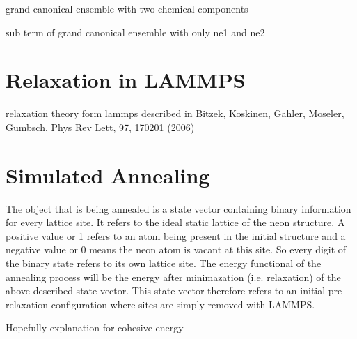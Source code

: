 grand canonical ensemble with two chemical components

sub term of grand canonical ensemble with only ne1 and ne2
\section{Relaxation in LAMMPS}
relaxation theory form lammps 
described in Bitzek, Koskinen, Gahler, Moseler, Gumbsch, Phys Rev Lett, 97, 170201 (2006)
 
\section{Simulated Annealing}
The object that is being annealed is a state vector containing binary information for every lattice site. It refers to the ideal static lattice of the neon structure. A positive value or 1 refers to an atom being present in the initial structure and a negative value or 0 means the neon atom is vacant at this site. So every digit of the binary state refers to its own lattice site. The energy functional of the annealing process will be the energy after minimazation (i.e. relaxation) of the above described state vector. This state vector therefore refers to an initial pre-relaxation configuration where sites are simply removed with \ac{LAMMPS}. 



Hopefully explanation for cohesive energy


%